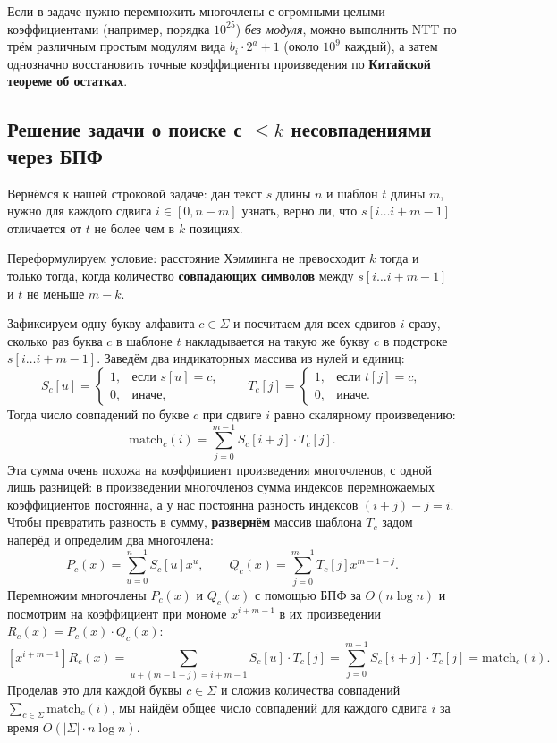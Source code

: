 \begin{note}
    Если в задаче нужно перемножить многочлены с огромными целыми коэффициентами (например, порядка $10^{25}$) \emph{без модуля}, можно выполнить NTT по трём различным простым модулям вида $b_i \cdot 2^a + 1$ (около $10^9$ каждый), а затем однозначно восстановить точные коэффициенты произведения по \textbf{Китайской теореме об остатках}.
\end{note}

\subsection{Решение задачи о поиске с \texorpdfstring{$\le k$}{<= k} несовпадениями через БПФ}

Вернёмся к нашей строковой задаче: дан текст $s$ длины $n$ и шаблон $t$ длины $m$, нужно для каждого сдвига $i \in [0, n - m]$ узнать, верно ли, что $s[i \dots i + m - 1]$ отличается от $t$ не более чем в $k$ позициях.

Переформулируем условие: расстояние Хэмминга не превосходит $k$ тогда и только тогда, когда количество \textbf{совпадающих символов} между $s[i \dots i + m - 1]$ и $t$ не меньше $m - k$.

Зафиксируем одну букву алфавита $c \in \Sigma$ и посчитаем для всех сдвигов $i$ сразу, сколько раз буква $c$ в шаблоне $t$ накладывается на такую же букву $c$ в подстроке $s[i \dots i + m - 1]$. Заведём два индикаторных массива из нулей и единиц:
\[
    S_c[u] = \begin{cases} 1, & \text{если } s[u] = c, \\ 0, & \text{иначе,} \end{cases}
    \qquad
    T_c[j] = \begin{cases} 1, & \text{если } t[j] = c, \\ 0, & \text{иначе.} \end{cases}
\]
Тогда число совпадений по букве $c$ при сдвиге $i$ равно скалярному произведению:
\[
    \text{match}_c(i) = \sum_{j=0}^{m-1} S_c[i + j] \cdot T_c[j].
\]
Эта сумма очень похожа на коэффициент произведения многочленов, с одной лишь разницей: в произведении многочленов сумма индексов перемножаемых коэффициентов постоянна, а у нас постоянна разность индексов $(i + j) - j = i$. Чтобы превратить разность в сумму, \textbf{развернём} массив шаблона $T_c$ задом наперёд и определим два многочлена:
\[
    P_c(x) = \sum_{u=0}^{n-1} S_c[u] x^u, \qquad Q_c(x) = \sum_{j=0}^{m-1} T_c[j] x^{m - 1 - j}.
\]
Перемножим многочлены $P_c(x)$ и $Q_c(x)$ с помощью БПФ за $O(n \log n)$ и посмотрим на коэффициент при мономе $x^{i + m - 1}$ в их произведении $R_c(x) = P_c(x) \cdot Q_c(x)$:
\[
    [x^{i + m - 1}] R_c(x) = \sum_{u + (m - 1 - j) = i + m - 1} S_c[u] \cdot T_c[j] = \sum_{j=0}^{m-1} S_c[i + j] \cdot T_c[j] = \text{match}_c(i).
\]
Проделав это для каждой буквы $c \in \Sigma$ и сложив количества совпадений $\sum_{c \in \Sigma} \text{match}_c(i)$, мы найдём общее число совпадений для каждого сдвига $i$ за время $O(|\Sigma| \cdot n \log n)$.


